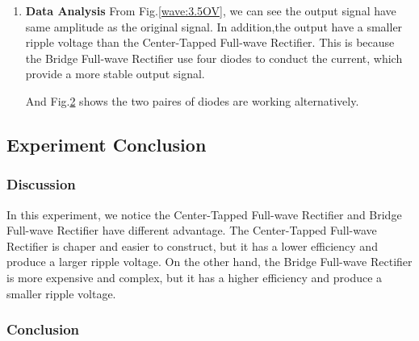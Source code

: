 \begin{enumerate}[I]
\begin{figure}[h]
\begin{subfigure}[h]{0.4\textwidth}
                    \caption{Diode Voltage}
                    \label{wave:3.5DV}
                \end{subfigure}
            \end{figure}
        \item \textbf{Data Analysis}\newline
            From Fig.\ref{wave:3.5OV}, we can see the output signal have same amplitude as the original signal. In addition,the output have a smaller ripple voltage than the Center-Tapped Full-wave Rectifier. This is because the Bridge Full-wave Rectifier use four diodes to conduct the current, which provide a more stable output signal.\par
            
            And Fig.\ref{wave:3.5DV} shows the two paires of diodes are working alternatively.
    \end{enumerate}
    
\subsection{Experiment Conclusion}
    \subsubsection{Discussion}
        In this experiment, we notice the Center-Tapped Full-wave Rectifier and Bridge Full-wave Rectifier have different advantage. The Center-Tapped Full-wave Rectifier is chaper and easier to construct, but it has a lower efficiency and produce a larger ripple voltage. On the other hand, the Bridge Full-wave Rectifier is more expensive and complex, but it has a higher efficiency and produce a smaller ripple voltage.
    \subsubsection{Conclusion}
